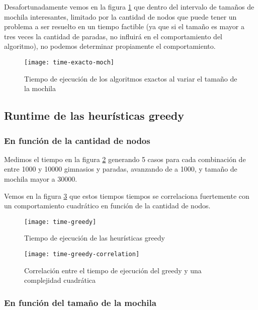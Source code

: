 Desafortunadamente vemos en la figura \ref{fig:time-exacto-moch} que dentro del intervalo de tamaños de mochila
interesantes, limitado por la cantidad de nodos que puede tener un problema a ser resuelto en un tiempo factible
(ya que si el tamaño es mayor a tres veces la cantidad de paradas, no influirá en el comportamiento del algoritmo),
no podemos determinar propiamente el comportamiento.

\begin{figure}[H]
	\centering
	\texttt{[image: time-exacto-moch]}
	\caption{Tiempo de ejecución de los algoritmos exactos al variar el tamaño de la mochila}
	\label{fig:time-exacto-moch}
\end{figure}

\subsection{Runtime de las heurísticas greedy}

\subsubsection{En función de la cantidad de nodos}

Medimos el tiempo en la figura \ref{fig:time-greedy} generando 5 casos para cada combinación de entre 1000 y 10000 gimnasios y paradas, avanzando de a 1000, y tamaño de mochila mayor a 30000.

Vemos en la figura \ref{fig:time-greedy-correlation} que estos tiempos tiempos se correlaciona fuertemente con un comportamiento cuadrático en función de la cantidad de nodos.

\begin{figure}[H]
	\centering
	\texttt{[image: time-greedy]}
	\caption{Tiempo de ejecución de las heurísticas greedy}
	\label{fig:time-greedy}
\end{figure}

\begin{figure}[H]
	\centering
	\texttt{[image: time-greedy-correlation]}
	\caption{Correlación entre el tiempo de ejecución del greedy y una complejidad cuadrática}
	\label{fig:time-greedy-correlation}
\end{figure}

\subsubsection{En función del tamaño de la mochila}


